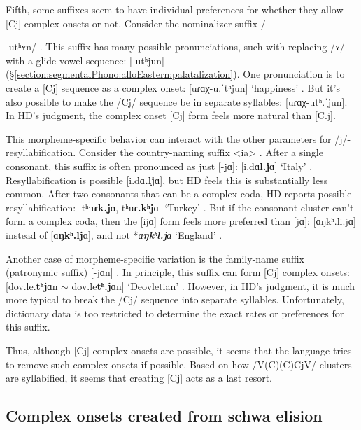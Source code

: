 	Fifth, some suffixes seem to have individual preferences for whether they allow [Cj] complex onsets or not.   Consider the nominalizer suffix /{-utʰʏn/ . This suffix has many possible pronunciations, such with replacing /ʏ/ with a glide-vowel sequence: [-utʰjun] (\S\ref{section:segmentalPhono:alloEastern:palatalization}). One pronunciation is to create a [Cj] sequence as a complex onset: [uɾɑχ-u.ˈtʰjun] `happiness' . But it's also possible to make the /Cj/ sequence be in separate syllables:  [uɾɑχ-utʰ.ˈjun]. In HD's judgment, the complex onset [Cj] form feels more natural than [C.j]. 
	
	This morpheme-specific behavior can interact with the other parameters for /j/-resyllabification. Consider the country-naming suffix   <ia> . After a single consonant, this suffix is often pronounced as just [-jɑ]: [i.dɑ\textbf{l.j}ɑ] `Italy' . Resyllabification is possible [i.dɑ\textbf{.lj}ɑ], but HD feels this is substantially less common.  After two consonants that can be a complex coda, HD reports possible resyllabification: [tʰu\textbf{ɾk.j}ɑ, tʰu\textbf{ɾ.kʰj}ɑ] `Turkey' . But if the consonant cluster    can't form a complex coda, then the [ijɑ] form feels more preferred than [jɑ]: [ɑŋkʰ.li.jɑ] instead of [ɑ\textbf{ŋkʰ.lj}ɑ], and not *\textit{ɑ\textbf{ŋkʰl.j}ɑ} `England' . 
	
	Another case of morpheme-specific variation is the family-name suffix (patronymic suffix) [-jɑn] . In principle, this suffix can form [Cj] complex onsets: [dov.le.\textbf{tʰj}ɑn $\sim$ dov.le\textbf{tʰ.j}ɑn] `Deovletian' . However, in   HD's judgment, it is much more typical to break the /Cj/ sequence into separate syllables. Unfortunately, dictionary data is too restricted to determine the exact rates or preferences for this suffix.  
	
	
	Thus, although [Cj] complex onsets are possible, it seems that the language tries to remove such complex onsets if possible. Based on how /V(C)(C)CjV/ clusters are syllabified, it seems that creating [Cj]  acts as a last resort. 
	
	
	
	
	
	
	
	
	\subsection{Complex onsets created from schwa elision}\label{section:syllable:ComplexOnset:Elision}
	
}
